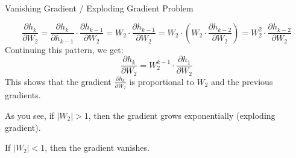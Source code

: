\documentclass[aspectratio=169,xcolor=dvipsnames,svgnames,x11names,fleqn]{beamer}
\begin{document}
\begin{frame}{Vanishing Gradient / Exploding Gradient Problem}

  $$
  \frac{\partial h_k}{\partial W_2} = \frac{\partial h_k}{\partial h_{k-1}}\cdot \frac{\partial h_{k-1}}{\partial W_2} = W_2\cdot  \frac{\partial h_{k-1}}{\partial W_2}  = W_2 \cdot \left( W_2 \cdot \frac{\partial h_{k-2}}{\partial W_2} \right) = W_2^2 \cdot \frac{\partial h_{k-2}}{\partial W_2}
  $$
  Continuing this pattern, we get:
  $$
  \frac{\partial h_k}{\partial W_2} = W_2^{k-1} \cdot \frac{\partial h_1}{\partial W_2}
  $$
  This shows that the gradient $\frac{\partial h_k}{\partial W_2}$ is proportional to $W_2$ and the previous gradients.

  \bigskip
  As you see, if $|W_2| > 1$, then the gradient grows exponentially (exploding gradient).

  \bigskip
  If $|W_2| < 1$, then the gradient vanishes.
\end{frame}
\end{document}
